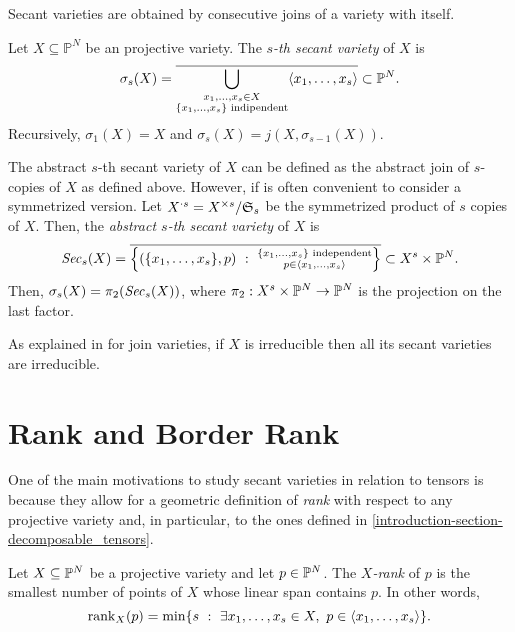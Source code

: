  Secant varieties are obtained by consecutive joins of a variety with itself.
 \begin{definition}
 \label{geometrySecants-definition-secantvariety}
 Let $X \subseteq \mathbb{P}^N$ be an projective variety. The {\it $s$-th secant variety} of $X$ is 
 \[
 \sigma_s(X) = \overline{\bigcup_{\substack{x_1,\ldots,x_s \in X \\ \{x_1,\ldots,x_s\} \text{ indipendent}}} \langle x_1,\ldots,x_s \rangle} \subset \mathbb{P}^N.
 \]
 Recursively, $\sigma_1(X) = X$ and $\sigma_s(X) = j(X,\sigma_{s-1}(X))$.
 
 The abstract $s$-th secant variety of $X$ can be defined as the abstract join of $s$-copies of $X$ as defined above. However, if is often convenient to consider a symmetrized version. Let $X^{\cdot s} = X^{\times s} / \mathfrak{S}_s$ be the symmetrized product of $s$ copies of $X$. Then, the {\it abstract $s$-th secant variety} of $X$ is 
 \[
     \mathit{Sec}_s(X) = \overline{\left\{(\{x_1,\ldots,x_s\},p) ~:~ \substack{\{x_1,\ldots,x_s\} \text{ independent} \\ p \in \langle x_1,\ldots,x_s \rangle}\right\}} \subset X^s \times \mathbb{P}^N.
 \]
 Then, $\sigma_s(X) = \pi_2(\mathit{Sec}_s(X))$, where $\pi_2 : X^s \times \mathbb{P}^N \rightarrow \mathbb{P}^N$ is the projection on the last factor.

 As explained in \label{geometrySecants-definition-join} for join varieties, if $X$ is irreducible then all its secant varieties are irreducible.  
 \end{definition}
 
 \section{Rank and Border Rank}
 \label{geometrySecants-section-rank}
 
 One of the main motivations to study secant varieties in relation to tensors is because they allow for a geometric definition of {\it rank} with respect to any projective variety and, in particular, to the ones defined in \ref{introduction-section-decomposable_tensors}.
 
 \begin{definition}
 \label{geometrySecants-definition-Xrank}
     Let $X \subseteq \mathbb{P}^N$ be a projective variety and let $p \in \mathbb{P}^N$. The \emph{$X$-rank} of $p$ is the smallest number of points of $X$ whose linear span contains $p$. In other words,
     \[
         \mathrm{rank}_X(p) = \min\{s ~:~ \exists x_1,\ldots,x_s \in X, ~ p \in \langle x_1,\ldots,x_s \rangle\}.
     \]
 \end{definition}
 

